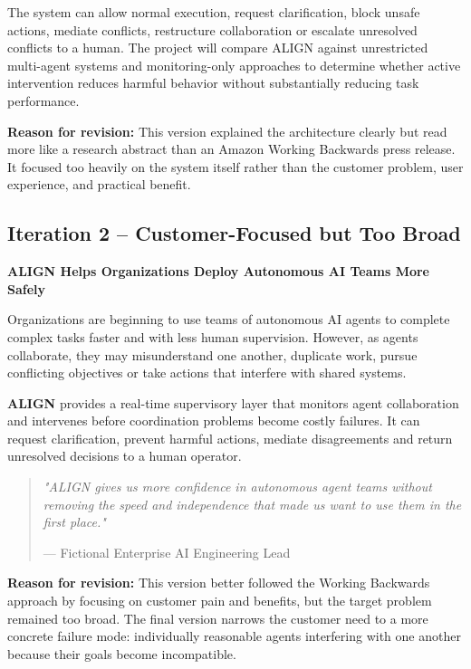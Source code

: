 \documentclass[11pt]{article}
\begin{document}
{The system can allow normal execution, request clarification, block unsafe actions, mediate conflicts, restructure collaboration or escalate unresolved conflicts to a human. The project will compare ALIGN against unrestricted multi-agent systems and monitoring-only approaches to determine whether active intervention reduces harmful behavior without substantially reducing task performance.

\textbf{Reason for revision:} This version explained the architecture clearly but read more like a research abstract than an Amazon Working Backwards press release. It focused too heavily on the system itself rather than the customer problem, user experience, and practical benefit.

\vspace{1em}

\subsection{Iteration 2 -- Customer-Focused but Too Broad}

\textbf{ALIGN Helps Organizations Deploy Autonomous AI Teams More Safely}

Organizations are beginning to use teams of autonomous AI agents to complete complex tasks faster and with less human supervision. However, as agents collaborate, they may misunderstand one another, duplicate work, pursue conflicting objectives or take actions that interfere with shared systems.

\textbf{ALIGN} provides a real-time supervisory layer that monitors agent collaboration and intervenes before coordination problems become costly failures. It can request clarification, prevent harmful actions, mediate disagreements and return unresolved decisions to a human operator.

\begin{quote}
\emph{"ALIGN gives us more confidence in autonomous agent teams without removing the speed and independence that made us want to use them in the first place."}

\hfill--- Fictional Enterprise AI Engineering Lead
\end{quote}

\textbf{Reason for revision:} This version better followed the Working Backwards approach by focusing on customer pain and benefits, but the target problem remained too broad. The final version narrows the customer need to a more concrete failure mode: individually reasonable agents interfering with one another because their goals become incompatible.

}
\end{document}

